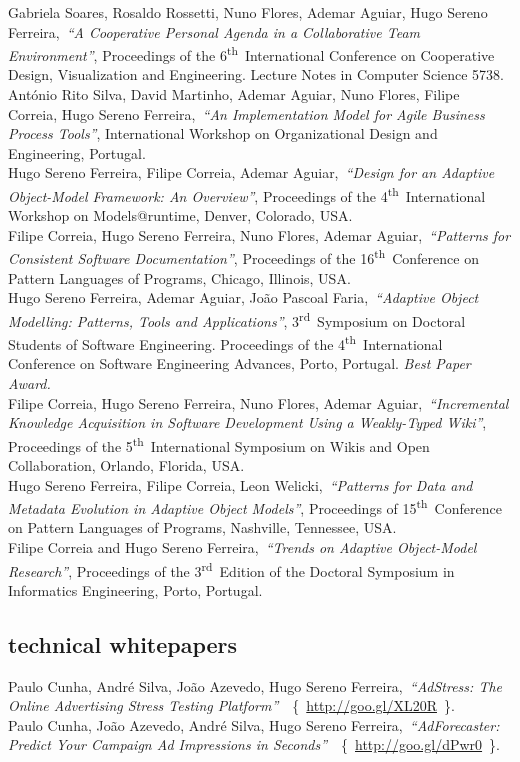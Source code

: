 \documentclass[9pt, a4paper]{article}
\newcommand{\current}{{\hspace{-0.97em}\color{feup}$\star$}~}
\newcommand{\years}[1]{\marginnote{\small #1}}
\newcommand{\nth}{\textsuperscript{th}~}
\newcommand{\rd}{\textsuperscript{rd}~}
\newcommand{\inurl}[1]{~\{~{\small\url{#1}~}\}}
\begin{document}
\years{2009}Gabriela Soares, Rosaldo Rossetti, Nuno Flores, Ademar Aguiar, Hugo Sereno Ferreira,~\emph{``A Cooperative Personal Agenda in a Collaborative Team Environment''}, Proceedings of the 6\nth International Conference on Cooperative Design, Visualization and Engineering. Lecture Notes in Computer Science 5738.\\
\years{2009}António Rito Silva, David Martinho, Ademar Aguiar, Nuno Flores, Filipe Correia, Hugo Sereno Ferreira,~\emph{``An Implementation Model for Agile Business Process Tools''}, International Workshop on Organizational Design and Engineering, Portugal.\\
\years{2009}Hugo Sereno Ferreira, Filipe Correia, Ademar Aguiar,~\emph{``Design for an Adaptive Object-Model Framework: An Overview''}, Proceedings of the 4\nth International Workshop on Models@runtime, Denver, Colorado, USA.\\
\years{2009}Filipe Correia, Hugo Sereno Ferreira, Nuno Flores, Ademar Aguiar,~\emph{``Patterns for Consistent Software Documentation''}, Proceedings of the 16\nth Conference on Pattern Languages of Programs, Chicago, Illinois, USA.\\
\years{\current~2009}Hugo Sereno Ferreira, Ademar Aguiar, João Pascoal Faria,~\emph{``Adaptive Object Modelling: Patterns, Tools and Applications''}, 3\rd Symposium on Doctoral Students of Software Engineering. Proceedings of the 4\nth International Conference on Software Engineering Advances, Porto, Portugal. \emph{Best Paper Award.}\\
\years{2009}Filipe Correia, Hugo Sereno Ferreira, Nuno Flores, Ademar Aguiar,~\emph{``Incremental Knowledge Acquisition in Software Development Using a Weakly-Typed Wiki''}, Proceedings of the 5\nth International Symposium on Wikis and Open Collaboration, Orlando, Florida, USA.\\
\years{2008}Hugo Sereno Ferreira, Filipe Correia, Leon Welicki,~\emph{``Patterns for Data and Metadata Evolution in Adaptive Object Models''}, Proceedings of 15\nth Conference on Pattern Languages of Programs, Nashville, Tennessee, USA.\\
\years{2008}Filipe Correia and Hugo Sereno Ferreira,~\emph{``Trends on Adaptive Object-Model Research''}, Proceedings of the 3\rd Edition of the Doctoral Symposium in Informatics Engineering, Porto, Portugal.

\subsection*{technical whitepapers}
\noindent\years{2012}Paulo Cunha, André Silva, João Azevedo, Hugo Sereno Ferreira,~\emph{``AdStress: The Online Advertising Stress Testing Platform''}~\inurl{http://goo.gl/XL20R}.\\
\years{2012}Paulo Cunha, João Azevedo, André Silva, Hugo Sereno Ferreira,~\emph{``AdForecaster: Predict Your Campaign Ad Impressions in Seconds''}~\inurl{http://goo.gl/dPwr0}.
\end{document}
